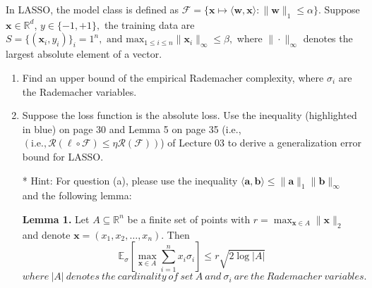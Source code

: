 \documentclass[
	12pt, %
]{fphw}
\begin{document}
\begin{problem}
In LASSO, the model class is defined as $\mathcal{F}=\{\mathbf{x}\mapsto\langle\mathbf{w},\mathbf{x}\rangle:\|\mathbf{w}\|_1\leq\alpha\}.$ Suppose $\mathbf{x}\in\mathbb{R}^d$, $y\in \{ - 1, + 1\} , $ the training data are $S= \{ ( \mathbf{x} _i, y_i) \} _i= 1^n, \text{ and max}_{1\leq i\leq n}\|\mathbf{x} _i\|_\infty\leq \beta, $ where $\|\cdot \|_\infty$ denotes the largest absolute element of a vector.
\medskip
\begin{enumerate}
\item Find an upper bound of the empirical Rademacher complexity, where $\sigma_i$ are the Rademacher variables. 
\item Suppose the loss function is the absolute loss. Use the inequality (highlighted in blue) on page
$30$ and Lemma 5 on page 35 (i.e., $(\mathrm{i.e.},\mathcal{R}(\ell\circ\mathcal{F})\leq\eta\mathcal{R}(\mathcal{F}))$) of Lecture 03 to derive a generalization error bound for LASSO.


  * Hint: For question (a), please use the inequality $\langle\mathbf{a},\mathbf{b}\rangle\leq\|\mathbf{a}\|_1\|\mathbf{b}\|_\infty$ and the following lemma:


  \textbf{Lemma 1.} Let \( A \subseteq \mathbb{R}^n \) be a finite set of points with \( r = \max_{\mathbf{x} \in A} \|\mathbf{x}\|_2 \) and denote \( \mathbf{x} = (x_1, x_2, \ldots, x_n) \). Then
  $$\mathbb{E}_{\sigma}\left[\max_{\mathbf{x}\in A}\sum_{i=1}^nx_i\sigma_i\right]\leq r\sqrt{2\log|A|}$$
$where\:|A|\:denotes\:the\:cardinality\:of\:set\:A\:and\:\sigma_i\:are\:the\:Rademacher\:variables.$
\end{enumerate}
\end{problem}
\end{document}
